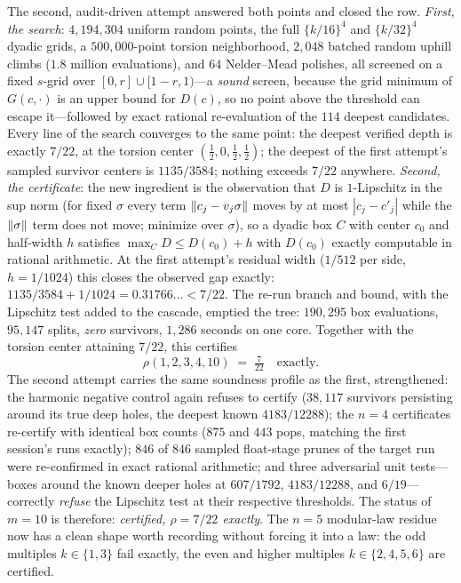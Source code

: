 The second, audit-driven attempt answered both points and closed the
row. \emph{First, the search}: $4{,}194{,}304$ uniform random points,
the full $\{k/16\}^4$ and $\{k/32\}^4$ dyadic grids, a
$500{,}000$-point torsion neighborhood, $2{,}048$ batched random uphill
climbs ($1.8$ million evaluations), and $64$ Nelder--Mead polishes,
all screened on a fixed $s$-grid over
$[0,r]\cup[1-r,1)$---a \emph{sound} screen, because the grid minimum
of $G(c,\cdot)$ is an upper bound for $D(c)$, so no point above the
threshold can escape it---followed by exact rational re-evaluation of
the $114$ deepest candidates. Every line of the search converges to
the same point: the deepest verified depth is exactly $7/22$, at the
torsion center $(\tfrac12,0,\tfrac12,\tfrac12)$; the deepest of the
first attempt's sampled survivor centers is $1135/3584$; nothing
exceeds $7/22$ anywhere. \emph{Second, the certificate}: the new
ingredient is the observation that $D$ is $1$-Lipschitz in the sup
norm (for fixed $\sigma$ every term $\lVert c_j-v_j\sigma \rVert$ moves by at
most $|c_j-c'_j|$ while the $\lVert \sigma \rVert$ term does not move; minimize
over $\sigma$), so a dyadic box $C$ with center $c_0$ and half-width
$h$ satisfies $\max_CD\le D(c_0)+h$ with $D(c_0)$ exactly computable
in rational arithmetic. At the first attempt's residual width
($1/512$ per side, $h=1/1024$) this closes the observed gap exactly:
$1135/3584+1/1024=0.31766\ldots<7/22$. The re-run branch and bound,
with the Lipschitz test added to the cascade, emptied the tree:
$190{,}295$ box evaluations, $95{,}147$ splits, \emph{zero}
survivors, $1{,}286$ seconds on one core. Together with the torsion
center attaining $7/22$, this certifies
\[
\rho(1,2,3,4,10)\;=\;\tfrac{7}{22}\quad\text{exactly.}
\]
The second attempt carries the same soundness profile as the first,
strengthened: the harmonic negative control again refuses to certify
($38{,}117$ survivors persisting around its true deep holes, the
deepest known $4183/12288$); the $n=4$ certificates re-certify with
identical box counts ($875$ and $443$ pops, matching the first
session's runs exactly); $846$ of $846$ sampled
float-stage prunes of the target run were re-confirmed in exact
rational arithmetic; and three adversarial unit tests---boxes
around the known deeper holes at $607/1792$, $4183/12288$, and
$6/19$---correctly \emph{refuse} the Lipschitz test at their
respective thresholds. The status of $m=10$ is therefore:
\emph{certified, $\rho=7/22$ exactly}. The $n=5$ modular-law residue
now has a clean shape worth recording without forcing it into a law:
the odd multiples $k\in\{1,3\}$ fail exactly, the even and higher
multiples $k\in\{2,4,5,6\}$ are certified.

